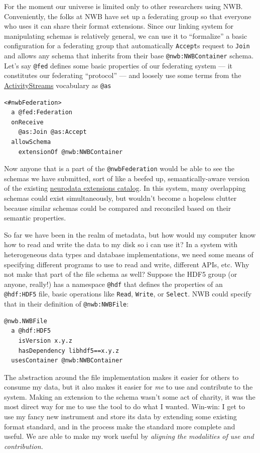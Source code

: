 \documentclass[10pt]{article}
\begin{document}
\begin{multicols}{2}
For the moment our universe is limited only to other researchers using
NWB. Conveniently, the folks at NWB have set up a federating group so
that everyone who uses it can share their format extensions. Since our
linking system for manipulating schemas is relatively general, we can
use it to ``formalize'' a basic configuration for a federating group
that automatically \texttt{Accept}s request to \texttt{Join} and allows
any schema that inherits from their base \texttt{@nwb:NWBContainer}
schema. Let's say \texttt{@fed} defines some basic properties of our
federating system --- it constitutes our federating ``protocol'' --- and
loosely use some terms from the
\href{https://www.w3.org/ns/activitystreams\#class-definitions}{ActivityStreams}
vocabulary as \texttt{@as}

\begin{verbatim}
<#nwbFederation>
  a @fed:Federation
  onReceive
    @as:Join @as:Accept
  allowSchema
    extensionOf @nwb:NWBContainer
\end{verbatim}

Now anyone that is a part of the \texttt{@nwbFederation} would be able
to see the schemas we have submitted, sort of like a beefed up,
semantically-aware version of the existing
\href{https://nwb-extensions.github.io/}{neurodata extensions catalog}.
In this system, many overlapping schemas could exist simultaneously, but
wouldn't become a hopeless clutter because similar schemas could be
compared and reconciled based on their semantic properties.

So far we have been in the realm of metadata, but how would my computer
know how to read and write the data to my disk so i can use it? In a
system with heterogeneous data types and database implementations, we
need some means of specifying different programs to use to read and
write, different APIs, etc. Why not make that part of the file schema as
well? Suppose the HDF5 group (or anyone, really!) has a namespace
\texttt{@hdf} that defines the properties of an \texttt{@hdf:HDF5} file,
basic operations like \texttt{Read}, \texttt{Write}, or \texttt{Select}.
NWB could specify that in their definition of \texttt{@nwb:NWBFile}:

\begin{verbatim}
@nwb.NWBFile
  a @hdf:HDF5
    isVersion x.y.z
    hasDependency libhdf5==x.y.z
  usesContainer @nwb:NWBContainer
\end{verbatim}

The abstraction around the file implementation makes it easier for
others to consume my data, but it also makes it easier for \emph{me} to
use and contribute to the system. Making an extension to the schema
wasn't some act of charity, it was the most direct way for me to use the
tool to do what I wanted. Win-win: I get to use my fancy new instrument
and store its data by extending some existing format standard, and in
the process make the standard more complete and useful. We are able to
make my work useful by \emph{aligning the modalities of use and
contribution.}


\end{multicols}
\end{document}
